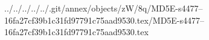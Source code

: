 ../../../../../.git/annex/objects/zW/8q/MD5E-s4477--16fa27cf39b1c31fd97791c75aad9530.tex/MD5E-s4477--16fa27cf39b1c31fd97791c75aad9530.tex